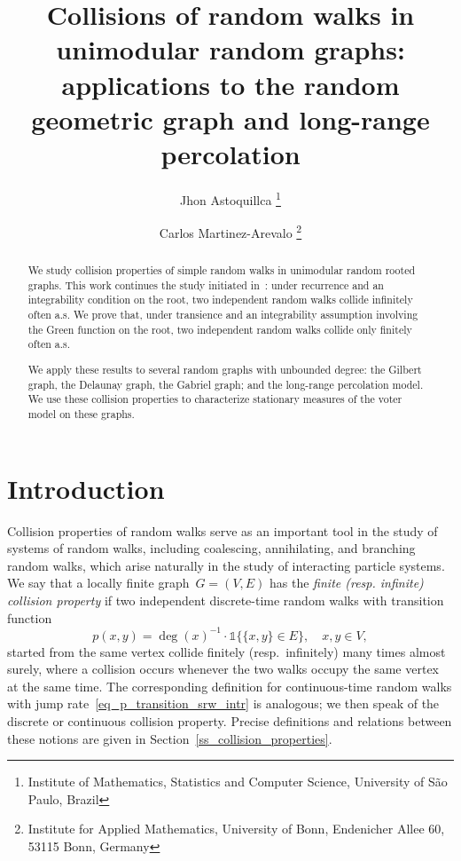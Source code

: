 \documentclass[a4paper,11pt]{article}
\title{Collisions of random walks in unimodular random graphs: applications to the random geometric graph and long-range percolation}
\author{Jhon Astoquillca \thanks{Institute of Mathematics, Statistics and Computer Science, University of S\~ao Paulo, Brazil} \and Carlos Martinez-Arevalo \thanks{Institute for Applied Mathematics, University of Bonn, Endenicher Allee 60, 53115 Bonn, Germany}}
\theoremstyle{definition}
\begin{document}
\maketitle

\begin{abstract}
We study collision properties of simple random walks in unimodular random rooted graphs. This work continues the study initiated in~\cite{HutchcroftPeres2015}: under recurrence and an integrability condition on the root, two independent random walks collide infinitely often a.s. We prove that, under transience and an integrability assumption involving the Green function on the root, two independent random walks collide only finitely often a.s. 

We apply these results to several random graphs with unbounded degree: the Gilbert graph, the Delaunay graph, the Gabriel graph; and the long-range percolation model. We use these collision properties to characterize stationary measures of the voter model on these graphs.
\end{abstract}

\section{Introduction}
Collision properties of random walks serve as an important tool in the study of systems of random walks, including coalescing, annihilating, and branching random walks, which arise naturally in the study of interacting particle systems. We say that a locally finite graph~$G=(V,E)$ has the \emph{finite (resp. infinite) collision property} if two independent discrete-time random walks with transition function
\begin{equation}\label{eq_p_transition_srw_intr}
p(x,y) = \deg(x)^{-1} \cdot \mathds{1}\{ \{x,y\} \in E \} , \quad x,y \in V,    
\end{equation}
started from the same vertex collide finitely (resp.~infinitely) many times almost surely, where a collision occurs whenever the two walks occupy the same vertex at the same time. The corresponding definition for continuous-time random walks with jump rate~\eqref{eq_p_transition_srw_intr} is analogous; we then speak of the discrete or continuous collision property. Precise definitions and relations between these notions are given in Section~\ref{ss_collision_properties}. 
\end{document}
